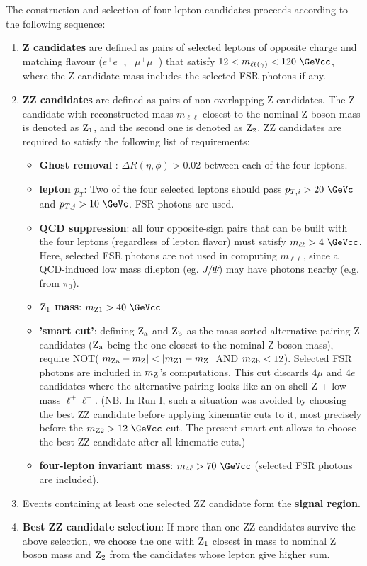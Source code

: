 The construction and selection of four-lepton candidates proceeds 
according to the following sequence:
\begin{enumerate}
\item {\bf Z candidates} are defined as pairs of selected leptons
 of opposite charge and matching flavour ($e^+ e^-$, \, $\mu^+\mu^-$)
 that satisfy $12 < m_{\ell\ell(\gamma)} < 120~\GeVcc$, where the Z candidate mass
 includes the selected FSR photons if any.
\item {\bf ZZ candidates} are defined as pairs of non-overlapping Z candidates.
 The Z candidate with reconstructed mass $m_{\ell\ell}$ closest to the nominal Z boson
 mass is denoted as ${\rm Z_1}$, and the second one is denoted as ${\rm Z_2}$.
 ZZ candidates are required to satisfy the following list of requirements:
  \begin{itemize} 
  \item {\bf Ghost removal }: $\Delta R(\eta,\phi) > 0.02$ between each of the four leptons.
  \item {\bf lepton $p_T$}: Two of the four selected leptons should pass 
     $p_{T,i} > 20~\GeVc$ and $p_{T,j} > 10~\GeVc$. FSR photons are used. 
  \item {\bf QCD suppression}: all four opposite-sign pairs that can
     be built with the four leptons (regardless of lepton flavor)
     must satisfy $m_{\ell\ell} > 4~\GeVcc$.
     Here, selected FSR photons are not used in computing $m_{\ell\ell}$, 
     since a QCD-induced low mass dilepton (eg. $J/\Psi$) 
     may have photons nearby (e.g. from $\pi_0$). 
  \item {\bf ${\rm Z_1}$ mass}: $m_{\rm Z1} > 40~\GeVcc$
  \item {\bf 'smart cut'}: defining ${\rm Z_a}$ and ${\rm Z_b}$ as 
     the mass-sorted alternative pairing Z candidates 
     (${\rm Z_a}$ being the one closest to the nominal Z boson mass),
     require NOT($|m_{\rm Za}-m_{\rm Z}| < |m_{\rm Z1}-m_{\rm Z}|$ AND $m_{\rm Zb}<12$).
     Selected FSR photons are included in $m_{\rm Z}$'s computations.
     This cut discards $4\mu$ and $4e$ candidates where the alternative pairing
     looks like an on-shell Z + low-mass $\ell^+ \ell^-$. 
     (NB. In Run I, such a situation was avoided by choosing the best ZZ candidate
     before applying kinematic cuts to it, most precisely before the $m_{\rm Z2} > 12~\GeVcc$ cut.
     The present smart cut allows to choose the best ZZ candidate after all kinematic cuts.)   
  \item {\bf four-lepton invariant mass}: $\mllll > 70~\GeVcc$ (selected FSR photons are included).
  \end{itemize}	
\item Events containing at least one selected ZZ candidate form the {\bf signal region}.
\item {\bf Best ZZ candidate selection}: If more than one ZZ candidates survive the above selection,
we choose the one with ${\rm Z_1}$ closest in mass to nominal 
Z boson mass and ${\rm Z_2}$ from the candidates whose lepton give higher \pt sum.
\end{enumerate}	


